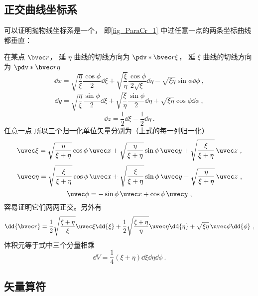 
\subsection{正交曲线坐标系}
可以证明抛物线坐标系是一个， 即\autoref{fig_ParaCr_1} 中过任意一点的两条坐标曲线都垂直：

在某点 $\bvec r$， 延 $\eta$ 曲线的切线方向为 $\pdv*{\bvec r}{\xi}$， 延 $\xi$ 曲线的切线方向为 $\pdv*{\bvec r}{\eta}$
\begin{equation}
\dd{x} = \sqrt{\frac{\eta}{\xi}}\frac{\cos\phi}{2}\dd{\xi} + \sqrt{\frac{\xi}{\eta}}\frac{\cos\phi}{2\sqrt{\xi}}\dd{\eta} - \sqrt{\xi\eta}\sin\phi\dd{\phi}~,
\end{equation}
\begin{equation}
\dd{y} = \sqrt{\frac{\eta}{\xi}}\frac{\sin\phi}{2}\dd{\xi} + \sqrt{\frac{\xi}{\eta}}\frac{\sin\phi}{2}\dd{\eta} + \sqrt{\xi\eta}\cos\phi\dd{\phi}~,
\end{equation}
\begin{equation}
\dd{z} = \frac{1}{2}\dd{\xi} - \frac{1}{2}\dd{\eta}~.
\end{equation}
任意一点 
所以三个归一化单位矢量分别为（上式的每一列归一化）
\begin{equation}
\uvec \xi = \sqrt{\frac{\eta}{\xi+\eta}}\cos\phi\,\uvec x + \sqrt{\frac{\eta}{\xi+\eta}}\sin\phi\,\uvec y + \sqrt{\frac{\xi}{\xi+\eta}}\,\uvec z~,
\end{equation}
\begin{equation}
\uvec \eta = \sqrt{\frac{\xi}{\xi+\eta}}\cos\phi\,\uvec x + \sqrt{\frac{\xi}{\xi+\eta}}\sin\phi\,\uvec y - \sqrt{\frac{\eta}{\xi+\eta}}\,\uvec z~,
\end{equation}
\begin{equation}
\uvec \phi = -\sin\phi \,\uvec x + \cos\phi \,\uvec y~,
\end{equation}
容易证明它们两两正交。另外有
\begin{equation}\label{eq_ParaCr_4}
\dd{\bvec r} = \frac{1}{2}\sqrt{\frac{\xi + \eta}{\xi}} \uvec \xi \dd{\xi}
+ \frac{1}{2}\sqrt{\frac{\xi + \eta}{\eta}} \uvec \eta \dd{\eta}
+ \sqrt{\xi\eta}\, \uvec \phi \dd{\phi}~,
\end{equation}
体积元等于式中三个分量相乘
\begin{equation}
\dd{V} = \frac{1}{4} (\xi + \eta) \dd{\xi}\dd{\eta}\dd{\phi}~.
\end{equation}

\subsection{矢量算符}

